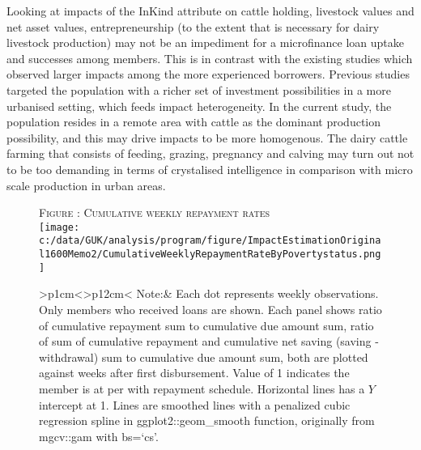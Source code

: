 	Looking at impacts of the \textsf{InKind} attribute on cattle holding, livestock values and net asset values, entrepreneurship (to the extent that is necessary for dairy livestock production) may not be an impediment for a microfinance loan uptake and successes among members. This is in contrast with the existing studies which observed larger impacts among the more experienced borrowers. Previous studies targeted the population with a richer set of investment possibilities in a more urbanised setting, which feeds impact heterogeneity. In the current study, the population resides in a remote area with cattle as the dominant production possibility, and this may drive impacts to be more homogenous. The dairy cattle farming that consists of feeding, grazing, pregnancy and calving may turn out not to be too demanding in terms of crystalised intelligence in comparison with micro scale production in urban areas. 

\begin{figure}
\hfil\textsc{\footnotesize Figure \thefigure: Cumulative weekly repayment rates\label{fig weeklysavingrepayrate}}\\
\hfil\texttt{[image: c:/data/GUK/analysis/program/figure/ImpactEstimationOriginal1600Memo2/CumulativeWeeklyRepaymentRateByPovertystatus.png]}\\
\renewcommand{\arraystretch}{1}
\hfil\begin{tabular}{>{\hfill\scriptsize}p{1cm}<{}>{\scriptsize}p{12cm}<{\hfill}}
Note:& Each dot represents weekly observations. Only members who received loans are shown. Each panel shows ratio of cumulative repayment sum to cumulative due amount sum, ratio of sum of cumulative repayment and cumulative net saving (saving - withdrawal) sum to cumulative due amount sum, both are plotted against weeks after first disbursement. Value of 1 indicates the member is at per with repayment schedule. Horizontal lines has a $Y$ intercept at 1. Lines are smoothed lines with a penalized cubic regression spline in \textsf{ggplot2::geom\_smooth} function, originally from \textsf{mgcv::gam} with \textsf{bs=`cs'}. \\[-1ex]
\end{tabular}
\end{figure}

\begin{figure}
\end{figure}


